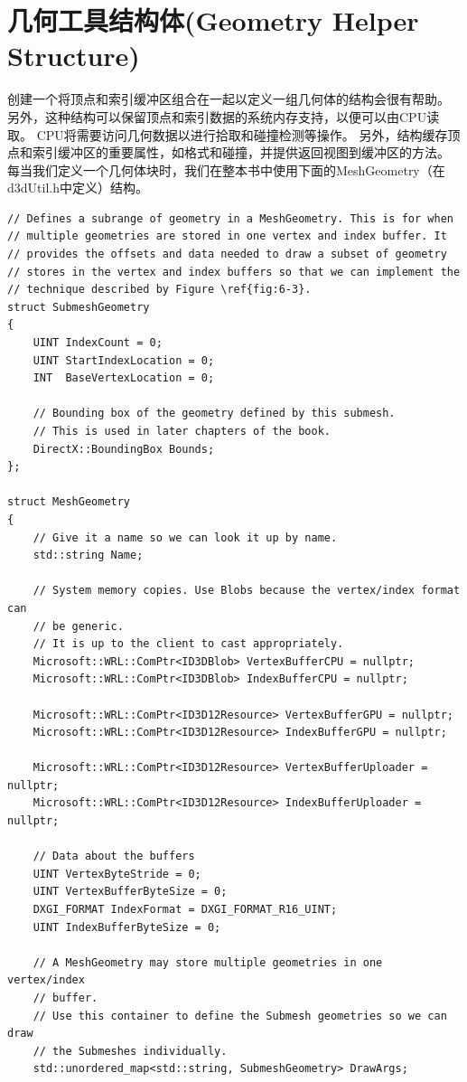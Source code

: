 \documentclass[11pt,a4paper,oldfontcommands]{memoir}
\begin{document}
{\section{几何工具结构体(Geometry Helper Structure)}
\begin{flushleft}
创建一个将顶点和索引缓冲区组合在一起以定义一组几何体的结构会很有帮助。 另外，这种结构可以保留顶点和索引数据的系统内存支持，以便可以由CPU读取。 CPU将需要访问几何数据以进行拾取和碰撞检测等操作。 另外，结构缓存顶点和索引缓冲区的重要属性，如格式和碰撞，并提供返回视图到缓冲区的方法。 每当我们定义一个几何体块时，我们在整本书中使用下面的MeshGeometry（在d3dUtil.h中定义）结构。\\
\begin{lstlisting}
// Defines a subrange of geometry in a MeshGeometry. This is for when
// multiple geometries are stored in one vertex and index buffer. It
// provides the offsets and data needed to draw a subset of geometry
// stores in the vertex and index buffers so that we can implement the
// technique described by Figure \ref{fig:6-3}.
struct SubmeshGeometry
{
    UINT IndexCount = 0;
    UINT StartIndexLocation = 0;
    INT  BaseVertexLocation = 0;

    // Bounding box of the geometry defined by this submesh.
    // This is used in later chapters of the book.
    DirectX::BoundingBox Bounds;
};

struct MeshGeometry
{
    // Give it a name so we can look it up by name.
    std::string Name;

    // System memory copies. Use Blobs because the vertex/index format can
    // be generic.
    // It is up to the client to cast appropriately.
    Microsoft::WRL::ComPtr<ID3DBlob> VertexBufferCPU = nullptr;
    Microsoft::WRL::ComPtr<ID3DBlob> IndexBufferCPU = nullptr;

    Microsoft::WRL::ComPtr<ID3D12Resource> VertexBufferGPU = nullptr;
    Microsoft::WRL::ComPtr<ID3D12Resource> IndexBufferGPU = nullptr;
    
    Microsoft::WRL::ComPtr<ID3D12Resource> VertexBufferUploader = nullptr;
    Microsoft::WRL::ComPtr<ID3D12Resource> IndexBufferUploader = nullptr;
    
    // Data about the buffers
    UINT VertexByteStride = 0;
    UINT VertexBufferByteSize = 0;
    DXGI_FORMAT IndexFormat = DXGI_FORMAT_R16_UINT;
    UINT IndexBufferByteSize = 0;
    
    // A MeshGeometry may store multiple geometries in one vertex/index
    // buffer.
    // Use this container to define the Submesh geometries so we can draw
    // the Submeshes individually.
    std::unordered_map<std::string, SubmeshGeometry> DrawArgs;
    

\end{lstlisting}
\end{flushleft}}
\end{document}
